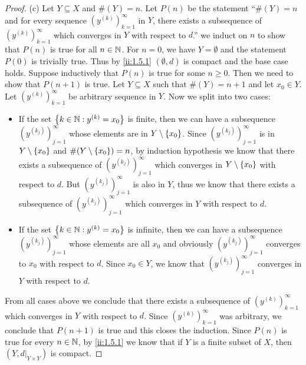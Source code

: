 \begin{proof}{(c)}
  Let \(Y \subseteq X\) and \(\#(Y) = n\).
  Let \(P(n)\) be the statement ``\(\#(Y) = n\) and for every sequence \((y^{(k)})_{k = 1}^\infty\) in \(Y\), there exists a subsequence of \((y^{(k)})_{k = 1}^\infty\) which converges in \(Y\) with respect to \(d\).''
  we induct on \(n\) to show that \(P(n)\) is true for all \(n \in \mathbb{N}\).
  For \(n = 0\), we have \(Y = \emptyset\) and the statement \(P(0)\) is trivially true.
  Thus by \cref{ii:1.5.1} \((\emptyset, d)\) is compact and the base case holds.
  Suppose inductively that \(P(n)\) is true for some \(n \geq 0\).
  Then we need to show that \(P(n + 1)\) is true.
  Let \(Y \subseteq X\) such that \(\#(Y) = n + 1\) and let \(x_0 \in Y\).
  Let \((y^{(k)})_{k = 1}^\infty\) be arbitrary sequence in \(Y\).
  Now we split into two cases:
  \begin{itemize}
    \item If the set \(\left\lbrace k \in \mathbb{N} : y^{(k)} = x_0\right\rbrace\) is finite, then we can have a subsequence \((y^{(k_j)})_{j = 1}^\infty\) whose elements are in \(Y \setminus \left\lbrace x_0\right\rbrace\).
          Since \((y^{(k_j)})_{j = 1}^\infty\) is in \(Y \setminus \left\lbrace x_0\right\rbrace\) and \(\#(Y \setminus \left\lbrace x_0\right\rbrace) = n\), by induction hypothesis we know that there exists a subsequence of \((y^{(k_j)})_{j = 1}^\infty\) which converges in \(Y \setminus \left\lbrace x_0\right\rbrace\) with respect to \(d\).
          But \((y^{(k_j)})_{j = 1}^\infty\) is also in \(Y\), thus we know that there exists a subsequence of \((y^{(k_j)})_{j = 1}^\infty\) which converges in \(Y\) with respect to \(d\).
    \item If the set \(\left\lbrace k \in \mathbb{N} : y^{(k)} = x_0\right\rbrace\) is infinite, then we can have a subsequence \((y^{(k_j)})_{j = 1}^\infty\) whose elements are all \(x_0\) and obviously \((y^{(k_j)})_{j = 1}^\infty\) converges to \(x_0\) with respect to \(d\).
          Since \(x_0 \in Y\), we know that \((y^{(k_j)})_{j = 1}^\infty\) converges in \(Y\) with respect to \(d\).
  \end{itemize}
  From all cases above we conclude that there exists a subsequence of \((y^{(k)})_{k = 1}^\infty\) which converges in \(Y\) with respect to \(d\).
  Since \((y^{(k)})_{k = 1}^\infty\) was arbitrary, we conclude that \(P(n + 1)\) is true and this closes the induction.
  Since \(P(n)\) is true for every \(n \in \mathbb{N}\), by \cref{ii:1.5.1} we know that if \(Y\) is a finite subset of \(X\), then \((Y, d|_{Y \times Y})\) is compact.
\end{proof}

\exercisesection

